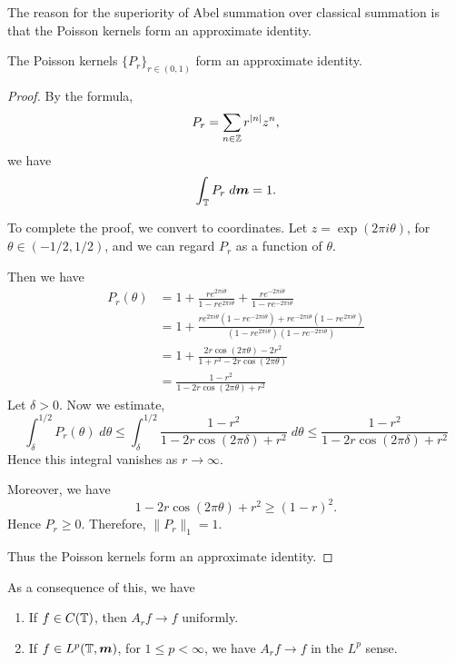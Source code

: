 The reason for the superiority of Abel summation
over classical summation is that the Poisson kernels form an approximate identity.
\begin{proposition}
    The Poisson kernels $\{P_r\}_{r \in (0,1)}$ form an approximate
    identity.
\end{proposition}
\begin{proof}
    By the formula,
    \begin{equation*}
        P_r = \sum_{n \in \mathbb{Z}} r^{|n|} z^n,
    \end{equation*}
    we have
    \begin{equation*}
        \int_{\mathbb{T}} P_r\;d\boldsymbol{m} = 1.
    \end{equation*}
    
    To complete the proof, we convert to coordinates. Let $z = \exp(2\pi i\theta)$,
    for $\theta \in (-1/2,1/2)$, and we can regard $P_r$ as a function of $\theta$.
    
    Then we have
    \begin{align*}
        P_r(\theta) &= 1 + \frac{re^{2\pi i \theta}}{1-re^{2\pi i \theta}}+\frac{re^{-2\pi i \theta}}{1-re^{-2\pi i \theta}}\\
        &= 1 + \frac{re^{2\pi i \theta}(1-re^{-2\pi i \theta})+re^{-2\pi i\theta}(1-re^{2\pi i \theta})}{(1-re^{2\pi i \theta})(1-re^{-2\pi i \theta})}\\
        &= 1 + \frac{2r\cos(2\pi \theta)-2r^2}{1+r^2-2r\cos(2\pi \theta)}\\
        &= \frac{1-r^2}{1-2r\cos(2\pi\theta)+r^2}
    \end{align*}
    Let $\delta > 0$. 
    Now we estimate,
    \begin{equation*}
        \int_{\delta}^{1/2} P_r(\theta)\; d\theta \leq \int_\delta^{1/2} \frac{1-r^2}{1-2r\cos(2\pi \delta)+r^2}\;d\theta \leq \frac{1-r^2}{1-2r\cos(2\pi \delta)+r^2}
    \end{equation*}
    Hence this integral vanishes as $r\rightarrow\infty$.
    
    Moreover, we have
    \begin{equation*}
        1-2r\cos(2\pi \theta) + r^2 \geq (1-r)^2.
    \end{equation*}
    Hence $P_r \geq 0$. Therefore, $\|P_r\|_1 = 1$.
    
    Thus the Poisson kernels form an approximate identity.
\end{proof}
As a consequence of this, we have
\begin{enumerate}
    \item{} If $f \in C(\mathbb{T})$, then $A_r f\rightarrow f$ uniformly.
    \item{} If $f \in L^p(\mathbb{T},\boldsymbol{m})$, for $1\leq p < \infty$, we have $A_rf\rightarrow f$
    in the $L^p$ sense.
\end{enumerate}


